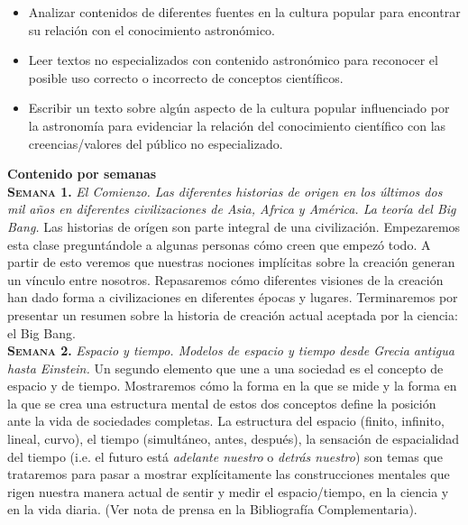 \documentclass[letterpaper,10pt,onecolumn]{article}
\begin{document}
\begin{itemize}
\item Analizar contenidos de diferentes fuentes en la cultura popular
  para encontrar su relaci\'on con el conocimiento astron\'omico.\\[-0.6cm]
\item Leer textos no especializados con contenido astron\'omico para
  reconocer el posible uso correcto o incorrecto de conceptos cient\'ificos.
\\[-0.6cm]
\item Escribir un texto sobre alg\'un aspecto de la cultura popular
  influenciado por la astronom\'ia para evidenciar la relaci\'on del
  conocimiento cient\'ifico con las creencias/valores del p\'ublico no
  especializado.\\[-0.2cm]  
\end{itemize}

\noindent\textbf{\large {} \quad Contenido por
  semanas}\\[-0.2cm] 


\noindent\normalsize \textbf{\textsc{Semana 1.}} \textit{El Comienzo. Las
diferentes historias de origen en los \'ultimos dos mil a\~nos
en diferentes civilizaciones de Asia, Africa y Am\'erica. La teor\'ia
del Big Bang.} Las historias de or\'igen son parte integral de una
civilizaci\'on. Empezaremos esta clase pregunt\'andole a algunas
personas c\'omo creen que empez\'o todo. A partir de esto veremos que
nuestras nociones impl\'icitas sobre la creaci\'on generan un
v\'inculo entre nosotros. Repasaremos c\'omo diferentes visiones de la
creaci\'on han dado forma a civilizaciones en diferentes
\'epocas y lugares. Terminaremos por presentar un resumen sobre la
historia de creaci\'on actual aceptada por la ciencia: el Big Bang.\\[-0.3cm]   


\noindent\textbf{\textsc{Semana 2.}} \textit{Espacio y tiempo. Modelos de
espacio y tiempo desde Grecia antigua hasta Einstein.} Un segundo
elemento que une a una sociedad es el concepto de espacio y de
tiempo. Mostraremos c\'omo la forma en la que se mide y la forma en la que se crea una
estructura mental de estos dos conceptos define la
posici\'on ante la vida de sociedades completas. La estructura del
espacio (finito, infinito, lineal, curvo), el tiempo (simult\'aneo,
antes, despu\'es), la sensaci\'on de espacialidad del tiempo (i.e. el
futuro est\'a \emph{adelante nuestro} o \emph{detr\'as   nuestro}) son
temas que trataremos para pasar a mostrar expl\'icitamente las
construcciones mentales que rigen nuestra manera actual de sentir y
medir el espacio/tiempo, en la ciencia y en la vida diaria. (Ver nota
de prensa en la Bibliograf\'ia Complementaria).\\[-0.3cm]  
\end{document}
